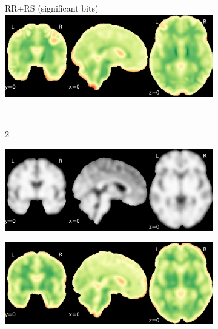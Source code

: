 \documentclass{article}
\begin{document}
\begin{appendices}
\begin{landscape}
\begin{figure}
\begin{subfigure}[t]{0.2\paperheight}
            \end{subfigure}
            \begin{subfigure}[t]{0.2\paperheight}
                \centering
                RR+RS (significant bits)
                \includegraphics[width=\textwidth]{figures/sig/10mm/rs_ds001600_sub-1_sig.pdf}
            \end{subfigure} \\
            \begin{subfigure}[b][][c]{0.01\paperwidth} 2 \vspace*{15pt} \end{subfigure}
            \begin{subfigure}[t]{0.2\paperheight}
                \centering
                \includegraphics[width=\textwidth]{figures/sig/10mm/ieee_ds001771_sub-36.pdf}
            \end{subfigure}
            \begin{subfigure}[t]{0.2\paperheight}
                \centering
                \includegraphics[width=\textwidth]{figures/sig/10mm/rr_ds001771_sub-36_sig.pdf}

\end{subfigure}
\end{figure}
\end{landscape}
\end{appendices}
\end{document}

